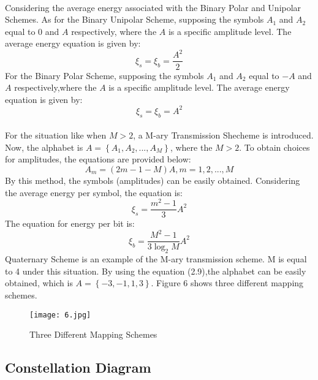 \documentclass[12pt]{article}
\begin{document}
    \paragraph{}
    Considering the average energy associated with the Binary Polar and Unipolar Schemes. As for the Binary Unipolar Scheme, supposing the symbols $A_1$ and $A_2$ equal to $0$ and $ A$ respectively, where the $A$ is a specific amplitude level. The average energy equation is given by:
    \begin{equation}
        \xi _s=\xi_b=\frac{A^2}{2}
    \end{equation}
    For the Binary Polar Scheme, supposing the symbols $A_1$ and $A_2$ equal to $-A$ and $ A$ respectively,where the $A$ is a specific amplitude level. The average energy equation is given by:
    \begin{equation}
        \xi _s=\xi_b=A^2
    \end{equation}
    
    \paragraph{}
    For the situation like when $M>2$, a M-ary Transmission Shecheme is introduced. Now, the alphabet is $A=\left \{A_1,A_2,...,A_M  \right \}$, where the $M>2$. To obtain choices for amplitudes, the equations are provided below:
    \begin{equation}
        A_m=(2m-1-M)A, m=1,2,...,M
    \end{equation}
    By this method, the symbols (amplitudes) can be easily obtained. Considering the average energy per symbol, the equation is:
    \begin{equation}
        \xi_s=\frac{m^2-1}{3}A^2
    \end{equation}
    The equation for energy per bit is:
    \begin{equation}
        \xi_b=\frac{M^2-1}{3\log_2M}A^2
    \end{equation}
    Quaternary Scheme is an example of the M-ary transmission scheme. M is equal to 4 under this situation. By using the equation (2.9),the alphabet can be easily obtained, which is $A=\left \{-3,-1,1,3  \right \}$. Figure 6 shows three different mapping schemes.
    \begin{figure}[H]
    \centering
    \texttt{[image: 6.jpg]}
    \caption{Three Different Mapping Schemes}
    \end{figure}
    

    \subsection{Constellation Diagram}
\end{document}
